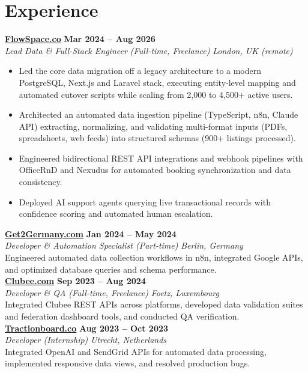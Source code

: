 \documentclass[a4paper,10pt]{article}
\newcommand{\role}[4]{%
 \textbf{#1} \hfill \textbf{#2}\\[1pt]%
 \textit{#3} \hfill \textit{#4}\\[2pt]%
}
\begin{document}
\section{Experience}

\role{\href{https://flowspace.co}{FlowSpace.co}}{Mar 2024 -- Aug 2026}{Lead Data \& Full-Stack Engineer (Full-time, Freelance)}{London, UK (remote)}
\begin{itemize}
 \item Led the core data migration off a legacy architecture to a modern PostgreSQL, Next.js and Laravel stack, executing entity-level mapping and automated cutover scripts while scaling from 2,000 to 4,500+ active users.
 \item Architected an automated data ingestion pipeline (TypeScript, n8n, Claude API) extracting, normalizing, and validating multi-format inputs (PDFs, spreadsheets, web feeds) into structured schemas (900+ listings processed).
 \item Engineered bidirectional REST API integrations and webhook pipelines with OfficeRnD and Nexudus for automated booking synchronization and data consistency.
 \item Deployed AI support agents querying live transactional records with confidence scoring and automated human escalation.
\end{itemize}

\role{\href{https://get2germany.com}{Get2Germany.com}}{Jan 2024 -- May 2024}{Developer \& Automation Specialist (Part-time)}{Berlin, Germany}
Engineered automated data collection workflows in n8n, integrated Google APIs, and optimized database queries and schema performance.\\[1pt]

\role{\href{https://clubee.com}{Clubee.com}}{Sep 2023 -- Aug 2024}{Developer \& QA (Full-time, Freelance)}{Foetz, Luxembourg}
Integrated Clubee REST APIs across platforms, developed data validation suites and federation dashboard tools, and conducted QA verification.\\[1pt]

\role{\href{https://tractionboard.co}{Tractionboard.co}}{Aug 2023 -- Oct 2023}{Developer (Internship)}{Utrecht, Netherlands}
Integrated OpenAI and SendGrid APIs for automated data processing, implemented responsive data views, and resolved production bugs.

\end{document}
